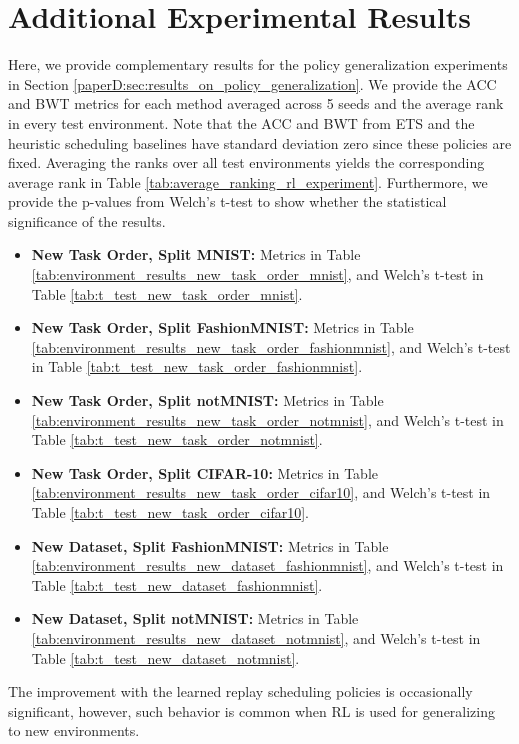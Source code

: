 
\section{Additional Experimental Results}\label{paperD:app:additional_experimental_results}


Here, we provide complementary results for the policy generalization experiments in Section \ref{paperD:sec:results_on_policy_generalization}. We provide the ACC and BWT metrics for each method averaged across 5 seeds and the average rank in every test environment. Note that the ACC and BWT from ETS and the heuristic scheduling baselines have standard deviation zero since these policies are fixed. Averaging the ranks over all test environments yields the corresponding average rank in Table \ref{tab:average_ranking_rl_experiment}. Furthermore, we provide the p-values from Welch's t-test to show whether the statistical significance of the results. 
\begin{itemize}[topsep=0pt,noitemsep]
	\item \textbf{New Task Order, Split MNIST:} Metrics in Table \ref{tab:environment_results_new_task_order_mnist}, and Welch's t-test in Table \ref{tab:t_test_new_task_order_mnist}.  
	
	\item \textbf{New Task Order, Split FashionMNIST:} Metrics in Table \ref{tab:environment_results_new_task_order_fashionmnist}, and Welch's t-test in Table \ref{tab:t_test_new_task_order_fashionmnist}.  
	
	\item \textbf{New Task Order, Split notMNIST:} Metrics in Table \ref{tab:environment_results_new_task_order_notmnist}, and Welch's t-test in Table \ref{tab:t_test_new_task_order_notmnist}.  
	
	\item \textbf{New Task Order, Split CIFAR-10:} Metrics in Table \ref{tab:environment_results_new_task_order_cifar10}, and Welch's t-test in Table \ref{tab:t_test_new_task_order_cifar10}. 
	
	\item \textbf{New Dataset, Split FashionMNIST:} Metrics in Table \ref{tab:environment_results_new_dataset_fashionmnist}, and Welch's t-test in Table \ref{tab:t_test_new_dataset_fashionmnist}. 
	
	\item \textbf{New Dataset, Split notMNIST:} Metrics in Table \ref{tab:environment_results_new_dataset_notmnist}, and Welch's t-test in Table \ref{tab:t_test_new_dataset_notmnist}. 
\end{itemize}
The improvement with the learned replay scheduling policies is occasionally significant, however, such behavior is common when RL is used for generalizing to new environments.

